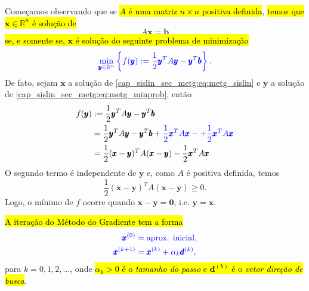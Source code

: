 Começamos observando que se \hl{$A$ é uma matriz $n\times n$ positiva definida}, \hl{temos que $\pmb{x}\in\mathbb{R}^n$ é solução de}
\begin{equation}\label{cap_sislin_sec_metg:eq:metg_sislin}
  A\pmb{x} = \pmb{b}
\end{equation}
\hl{se, e somente se, $\pmb{x}$ é solução do seguinte problema de minimização}
\begin{equation}\label{cap_sislin_sec_metg:eq:metg_minprob}\color{blue}\min_{\pmb{y}\in\mathbb{R}^n}\left\{f(\pmb{y}) := \frac{1}{2}\pmb{y}^TA\pmb{y}-\pmb{y}^T\pmb{b}\right\}.
\end{equation}
De fato, sejam $\pmb{x}$ a solução de \eqref{cap_sislin_sec_metg:eq:metg_sislin} e $\pmb{y}$ a solução de \eqref{cap_sislin_sec_metg:eq:metg_minprob}, então
\begin{align}
  f(\pmb{y}) &:= \frac{1}{2}\pmb{y}^TA\pmb{y}-\pmb{y}^T\pmb{b}\\
             &= \frac{1}{2}\pmb{y}^TA\pmb{y}-\pmb{y}^T\pmb{b} + {\color{blue}\frac{1}{2}\pmb{x}^TA\pmb{x} - + \frac{1}{2}\pmb{x}^TA\pmb{x}}\\
             &= \frac{1}{2}(\pmb{x}-\pmb{y})^TA(\pmb{x}-\pmb{y}) - \frac{1}{2}\pmb{x}^TA\pmb{x}
\end{align}
O segundo termo é independente de $\pmb{y}$ e, como $A$ é positiva definida, temos
\begin{equation}
  \frac{1}{2}(\pmb{x}-\pmb{y})^TA(\pmb{x}-\pmb{y}) \geq 0.
\end{equation}
Logo, o mínimo de $f$ ocorre quando $\pmb{x}-\pmb{y} = \pmb{0}$, i.e. $\pmb{y} = \pmb{x}$.

\hl{A iteração do Método do Gradiente tem a forma}
\begin{equation}\color{blue}\begin{aligned}
    \pmb{x}^{(0)} &= \text{aprox. inicial},\\
    \pmb{x}^{(k+1)} &= \pmb{x}^{(k)} + \alpha_k\pmb{d}^{(k)},
  \end{aligned}
\end{equation}
para $k=0, 1, 2, \ldots$, onde \hl{$\alpha_k>0$ é o \emph{tamanho do passo} e $\pmb{d}^{(k)}$ é o \emph{vetor direção de busca}}.

